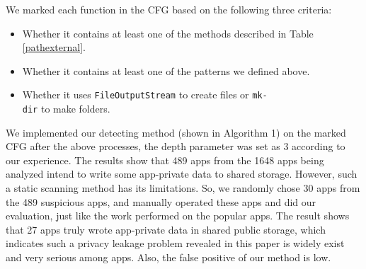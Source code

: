 \documentclass{sig-alternate}
\makeatletter
\newcommand{\tabincell}[2]{\begin{tabular}{@{}#1@{}}#2\end{tabular}}
\makeatother
\begin{document}
We marked each function  in the CFG based on the following three criteria:

\begin{itemize}

 \item Whether it contains at least one of the methods described in Table \ref{pathexternal}.

 \item Whether it contains at least one of the patterns we defined above.

 \item Whether it uses \texttt{FileOutputStream} to create files or \texttt{mk-\\dir} to make folders.

\end{itemize}



\begin{table}[htb]
\centering
\caption{Methods of getting path of shared public storage}
\newsavebox{\tableboxz}
\label{pathexternal}
\scalebox{0.8}{\usebox{\tableboxz}}
\end{table}



We implemented our detecting method (shown in Algorithm 1) on the marked CFG after the above processes, the depth parameter was set as 3 according to our experience. The results show that 489 apps from the 1648 apps being analyzed intend to write some app-private data to shared storage. However, such a static scanning method has its limitations. So, we randomly chose 30 apps from the 489 suspicious apps, and manually operated these apps and did our evaluation, just like the work performed on the popular apps. The result shows that 27 apps truly wrote app-private data in shared public storage, which indicates such a privacy leakage problem revealed in this paper is widely exist and very serious among apps. Also, the false positive of our method is low.
\end{document}
